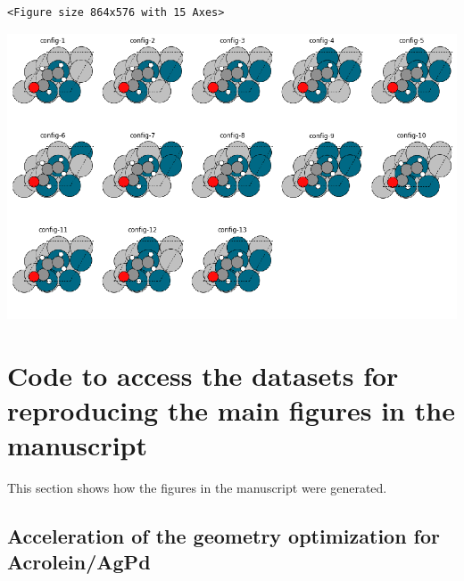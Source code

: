 \documentclass[aps,prl,citeautoscript,preprint,citeautoscript,showkeys]{revtex4-1}
\begin{document}
\begin{verbatim}
<Figure size 864x576 with 15 Axes>
\end{verbatim}


\begin{center}
\includegraphics[width=.9\linewidth]{obipy-resources/488c510fd61eaf8a765856c1b3f36ad3-27044S6T.png}
\end{center}



\section{Code to access the datasets for reproducing the main figures in the manuscript}
\label{sec:org95dcfa5}

This section shows how the figures in the manuscript were generated.

\subsection{Acceleration of the geometry optimization for Acrolein/AgPd}
\label{sec:org44d385b}
\end{document}
